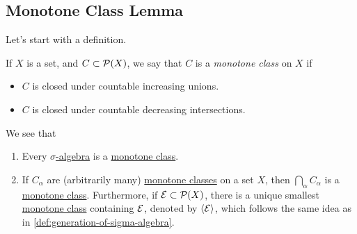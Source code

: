 \subsection{Monotone Class Lemma}
Let's start with a definition.
\begin{definition}\label{def:monotone-class}
	If \(X\) is a set, and \(C\subset \mathcal{\MakeUppercase{p}} (X)\), we say that \(C\) is a \emph{monotone class} on \(X\) if
	\begin{itemize}
		\item \(C\) is closed under countable increasing unions.
		\item \(C\) is closed under countable decreasing intersections.
	\end{itemize}
\end{definition}

\begin{eg}
	We see that
	\begin{enumerate}
		\item Every \hyperref[def:sigma-algebra]{\(\sigma\)-algebra} is a \hyperref[def:monotone-class]{monotone class}.
		\item If \(C_\alpha \) are (arbitrarily many) \hyperref[def:monotone-class]{monotone classes} on a set \(X\), then \(\bigcap\limits_{\alpha}C_\alpha  \)
		      is a \hyperref[def:monotone-class]{monotone class}. Furthermore, if \(\mathcal{\MakeUppercase{e}} \subset \mathcal{\MakeUppercase{p}} (X)\), there is a unique smallest
		      \hyperref[def:monotone-class]{monotone class} containing \(\mathcal{\MakeUppercase{e}}\), denoted by \(\left< \mathcal{\MakeUppercase{e}}  \right> \), which follows the same
		      idea as in \autoref{def:generation-of-sigma-algebra}.
	\end{enumerate}
\end{eg}

